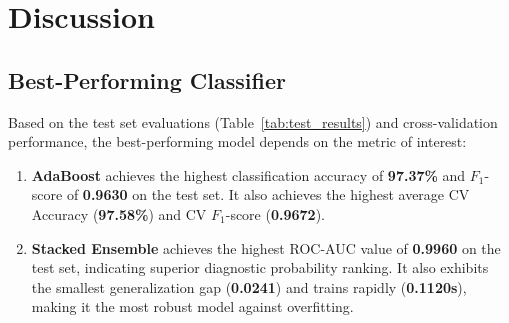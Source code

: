 \documentclass[12pt,a4paper]{article}
\begin{document}
\section{Discussion}

\subsection{Best-Performing Classifier}
Based on the test set evaluations (Table~\ref{tab:test_results}) and cross-validation performance, the best-performing model depends on the metric of interest:
\begin{enumerate}
    \item \textbf{AdaBoost} achieves the highest classification accuracy of \textbf{97.37\%} and $F_1$-score of \textbf{0.9630} on the test set. It also achieves the highest average CV Accuracy (\textbf{97.58\%}) and CV $F_1$-score (\textbf{0.9672}).
    \item \textbf{Stacked Ensemble} achieves the highest ROC-AUC value of \textbf{0.9960} on the test set, indicating superior diagnostic probability ranking. It also exhibits the smallest generalization gap (\textbf{0.0241}) and trains rapidly (\textbf{0.1120s}), making it the most robust model against overfitting.
\end{enumerate}
\end{document}

